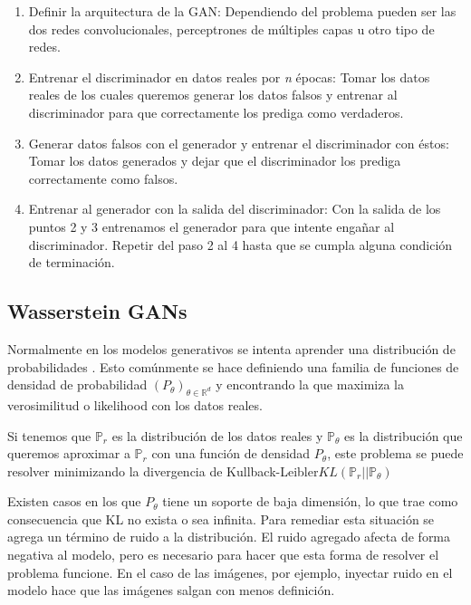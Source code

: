\documentclass[spanish]{report}
\begin{document}
\begin{enumerate}
\item Definir la arquitectura de la GAN: Dependiendo del problema pueden ser las dos redes convolucionales, perceptrones de múltiples capas u otro tipo de redes.
\item Entrenar el discriminador en datos reales por \textit{n} épocas: Tomar los datos reales de los cuales queremos generar los datos falsos y entrenar al discriminador para que correctamente los prediga como verdaderos.
\item Generar datos falsos con el generador y entrenar el discriminador con éstos: Tomar los datos generados y dejar que el discriminador los prediga correctamente como falsos.
\item Entrenar al generador con la salida del discriminador: Con la salida de los puntos 2 y 3 entrenamos el generador para que intente engañar al discriminador.
Repetir del paso 2 al 4 hasta que se cumpla alguna condición de terminación.
\end{enumerate}

\subsection{Wasserstein GANs}

Normalmente en los modelos generativos se intenta aprender una distribución de probabilidades \cite{wgan_web}. Esto comúnmente se hace definiendo una familia de funciones de densidad de probabilidad $(P_{\theta})_{\theta\in\mathbb{R}^d}$ y encontrando la que maximiza la verosimilitud o likelihood con los datos reales.

Si tenemos que $\mathbb{P}_{r}$ es la distribución de los datos reales y $\mathbb{P}_{\theta}$ es la distribución que queremos aproximar a $\mathbb{P}_{r}$ con una función de densidad $P_{\theta}$, este problema se puede resolver minimizando la divergencia de Kullback-Leibler\footnotemark $KL(\mathbb{P}_{r}||\mathbb{P}_{\theta})$ 


Existen casos en los que $P_{\theta}$ tiene un soporte de baja dimensión, lo que trae como consecuencia que KL no exista o sea infinita. Para remediar esta situación se agrega un término de ruido a la distribución. El ruido agregado afecta de forma negativa al modelo, pero es necesario para hacer que esta forma de resolver el problema funcione. En el caso de las imágenes, por ejemplo, inyectar ruido en el modelo hace que las imágenes salgan con menos definición.
\end{document}
